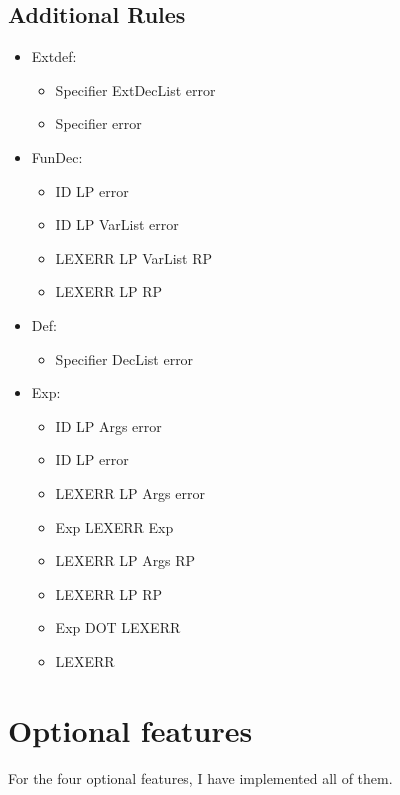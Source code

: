 \documentclass{article}
\begin{document}
        \subsection{Additional Rules}
            \begin{itemize}
                \item Extdef: 
                \begin{itemize}
                    \item Specifier ExtDecList error 
                    \item Specifier error
                \end{itemize}
                \item FunDec:
                \begin{itemize}
                    \item ID LP error
                    \item ID LP VarList error
                    \item LEXERR LP VarList RP
                    \item LEXERR LP RP
                \end{itemize}
                \item Def:
                \begin{itemize}
                    \item Specifier DecList error
                \end{itemize}
                \item Exp:
                \begin{itemize}
                    \item ID LP Args error
                    \item ID LP error
                    \item LEXERR LP Args error
                    \item Exp LEXERR Exp
                    \item LEXERR LP Args RP
                    \item LEXERR LP RP
                    \item Exp DOT LEXERR 
                    \item LEXERR
                \end{itemize}
            \end{itemize}
   
    \section{Optional features}
        For the four optional features, I have implemented all of them. 
        
\end{document}
